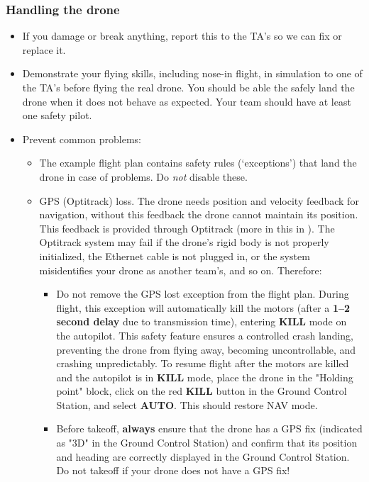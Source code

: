 \subsubsection*{Handling the drone}
\begin{itemize}
	\item If you damage or break anything, report this to the TA's so we can fix or replace it.
	\item Demonstrate your flying skills, including nose-in flight, in simulation to one of the TA's before flying the real drone. You should be able the safely land the drone when it does not behave as expected. Your team should have at least one safety pilot.
	\item Prevent common problems:
	\begin{itemize}
		\item The example flight plan contains safety rules (`exceptions') that land the drone in case of problems. Do \emph{not} disable these.
		\item GPS (Optitrack) loss. The drone needs position and velocity feedback for navigation, without this feedback the drone cannot maintain its position. This feedback is provided through Optitrack (more in this in ). The Optitrack system may fail if the drone's rigid body is not properly initialized, the Ethernet cable is not plugged in, or the system misidentifies your drone as another team's, and so on. Therefore:
		\begin{itemize}
			\item Do not remove the GPS lost exception from the flight plan. During flight, this exception will automatically kill the motors (after a \textbf{1--2 second delay} due to transmission time), entering \textbf{KILL} mode on the autopilot. This safety feature ensures a controlled crash landing, preventing the drone from flying away, becoming uncontrollable, and crashing unpredictably. To resume flight after the motors are killed and the autopilot is in \textbf{KILL} mode, place the drone in the "Holding point" block, click on the red \textbf{KILL} button in the Ground Control Station, and select \textbf{AUTO}. This should restore NAV mode.
			\item Before takeoff, \textbf{always} ensure that the drone has a GPS fix (indicated as "3D" in the Ground Control Station) and confirm that its position and heading are correctly displayed in the Ground Control Station. Do not takeoff if your drone does not have a GPS fix!
		\end{itemize}

\end{itemize}
\end{itemize}
